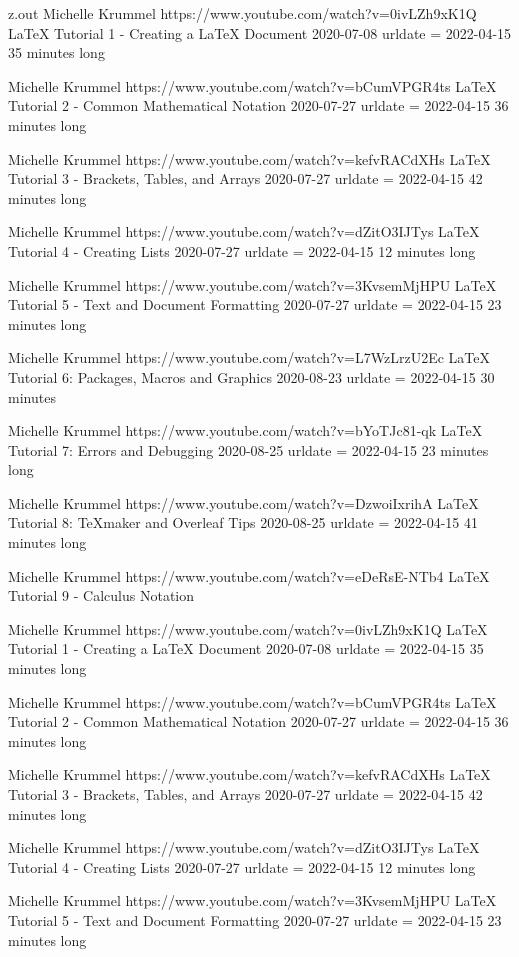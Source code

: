 \begin{VerbatimOut}{z.out}
Michelle Krummel
https://www.youtube.com/watch?v=0ivLZh9xK1Q
LaTeX Tutorial 1 - Creating a LaTeX Document
2020-07-08
urldate = {2022-04-15}
35 minutes long

Michelle Krummel
https://www.youtube.com/watch?v=bCumVPGR4ts
LaTeX Tutorial 2 - Common Mathematical Notation
2020-07-27
urldate = {2022-04-15}
36 minutes long

Michelle Krummel
https://www.youtube.com/watch?v=kefvRACdXHs
LaTeX Tutorial 3 - Brackets, Tables, and Arrays
2020-07-27
urldate = {2022-04-15}
42 minutes long

Michelle Krummel
https://www.youtube.com/watch?v=dZitO3IJTys
LaTeX Tutorial 4 - Creating Lists
2020-07-27
urldate = {2022-04-15}
12 minutes long

Michelle Krummel
https://www.youtube.com/watch?v=3KvsemMjHPU
LaTeX Tutorial 5 - Text and Document Formatting
2020-07-27
urldate = {2022-04-15}
23 minutes long

Michelle Krummel
https://www.youtube.com/watch?v=L7WzLrzU2Ec
LaTeX Tutorial 6: Packages, Macros and Graphics
2020-08-23
urldate = {2022-04-15}
30 minutes

Michelle Krummel
https://www.youtube.com/watch?v=bYoTJc81-qk
LaTeX Tutorial 7: Errors and Debugging
2020-08-25
urldate = {2022-04-15}
23 minutes long

Michelle Krummel
https://www.youtube.com/watch?v=DzwoiIxrihA
LaTeX Tutorial 8: TeXmaker and Overleaf Tips
2020-08-25
urldate = {2022-04-15}
41 minutes long

Michelle Krummel
https://www.youtube.com/watch?v=eDeRsE-NTb4
LaTeX Tutorial 9 - Calculus Notation





Michelle Krummel
https://www.youtube.com/watch?v=0ivLZh9xK1Q
LaTeX Tutorial 1 - Creating a LaTeX Document
2020-07-08
urldate = {2022-04-15}
35 minutes long

Michelle Krummel
https://www.youtube.com/watch?v=bCumVPGR4ts
LaTeX Tutorial 2 - Common Mathematical Notation
2020-07-27
urldate = {2022-04-15}
36 minutes long

Michelle Krummel
https://www.youtube.com/watch?v=kefvRACdXHs
LaTeX Tutorial 3 - Brackets, Tables, and Arrays
2020-07-27
urldate = {2022-04-15}
42 minutes long

Michelle Krummel
https://www.youtube.com/watch?v=dZitO3IJTys
LaTeX Tutorial 4 - Creating Lists
2020-07-27
urldate = {2022-04-15}
12 minutes long

Michelle Krummel
https://www.youtube.com/watch?v=3KvsemMjHPU
LaTeX Tutorial 5 - Text and Document Formatting
2020-07-27
urldate = {2022-04-15}
23 minutes long


\end{VerbatimOut}
